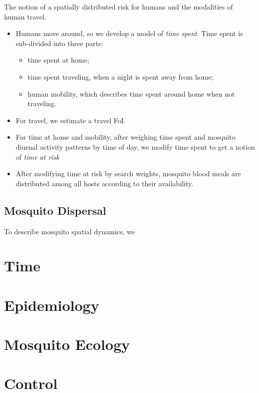\documentclass[
]{book}
\begin{document}
The notion of a spatially distributed risk for humans and the modalities of human travel.

\begin{itemize}
\item
  Humans move around, so we develop a model of \emph{time spent}. Time spent is sub-divided into three parts:

  \begin{itemize}
  \item
    time spent at home;
  \item
    time spent traveling, when a night is spent away from home;
  \item
    human mobility, which describes time spent around home when not traveling.
  \end{itemize}
\item
  For travel, we estimate a travel FoI.
\item
  For time at home and mobility, after weighing time spent and mosquito diurnal activity patterns by time of day, we modify time spent to get a notion of \emph{time at risk}
\item
  After modifying time at risk by search weights, mosquito blood meals are distributed among all hosts according to their availability.
\end{itemize}

\hypertarget{mosquito-dispersal}{%
\subsection{Mosquito Dispersal}\label{mosquito-dispersal}}

To describe mosquito spatial dynamics, we

\hypertarget{time}{%
\section{Time}\label{time}}

\hypertarget{epidemiology}{%
\section{Epidemiology}\label{epidemiology}}

\hypertarget{mosquito-ecology-1}{%
\section{Mosquito Ecology}\label{mosquito-ecology-1}}

\hypertarget{control}{%
\section{Control}\label{control}}
\end{document}
